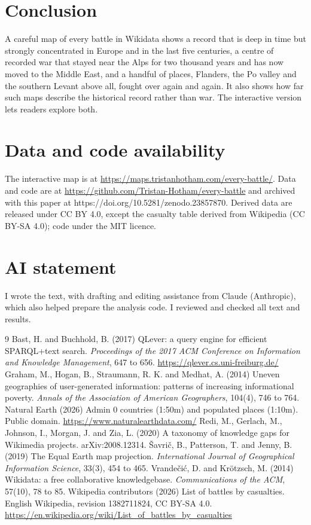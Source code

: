 \documentclass[11pt,a4paper]{article}
\begin{document}
\section{Conclusion}
A careful map of every battle in Wikidata shows a record that is deep in time but strongly concentrated in Europe and in the last five centuries, a centre of recorded war that stayed near the Alps for two thousand years and has now moved to the Middle East, and a handful of places, Flanders, the Po valley and the southern Levant above all, fought over again and again. It also shows how far such maps describe the historical record rather than war. The interactive version lets readers explore both.

\section*{Data and code availability}
The interactive map is at \url{https://maps.tristanhotham.com/every-battle/}. Data and code are at \url{https://github.com/Tristan-Hotham/every-battle} and archived with this paper at https://doi.org/10.5281/zenodo.23857870. Derived data are released under CC BY 4.0, except the casualty table derived from Wikipedia (CC BY-SA 4.0); code under the MIT licence.

\section*{AI statement}
I wrote the text, with drafting and editing assistance from Claude (Anthropic), which also helped prepare the analysis code. I reviewed and checked all text and results.

\begin{thebibliography}{9}
 Bast, H. and Buchhold, B. (2017) QLever: a query engine for efficient SPARQL+text search. \emph{Proceedings of the 2017 ACM Conference on Information and Knowledge Management}, 647 to 656. \url{https://qlever.cs.uni-freiburg.de/}
 Graham, M., Hogan, B., Straumann, R. K. and Medhat, A. (2014) Uneven geographies of user-generated information: patterns of increasing informational poverty. \emph{Annals of the Association of American Geographers}, 104(4), 746 to 764.
 Natural Earth (2026) Admin 0 countries (1:50m) and populated places (1:10m). Public domain. \url{https://www.naturalearthdata.com/}
 Redi, M., Gerlach, M., Johnson, I., Morgan, J. and Zia, L. (2020) A taxonomy of knowledge gaps for Wikimedia projects. arXiv:2008.12314.
 Šavrič, B., Patterson, T. and Jenny, B. (2019) The Equal Earth map projection. \emph{International Journal of Geographical Information Science}, 33(3), 454 to 465.
 Vrandečić, D. and Krötzsch, M. (2014) Wikidata: a free collaborative knowledgebase. \emph{Communications of the ACM}, 57(10), 78 to 85.
 Wikipedia contributors (2026) List of battles by casualties. English Wikipedia, revision 1382711824, CC BY-SA 4.0. \url{https://en.wikipedia.org/wiki/List_of_battles_by_casualties}
\end{thebibliography}
\end{document}
